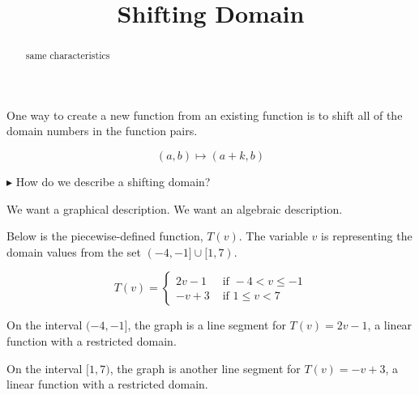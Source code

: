 \documentclass{ximera}
\title{Shifting Domain}
\begin{document}
\begin{abstract}
same characteristics
\end{abstract}
\maketitle








One way to create a new function from an existing function is to shift all of the domain numbers in the function pairs. 

\[
(a, b) \mapsto (a + k, b)
\]



\textbf{\textcolor{blue!55!black}{$\blacktriangleright$}} How do we describe a shifting domain? 

We want a graphical description. We want an algebraic description. 




Below is the piecewise-defined function, $T(v)$.  The variable $v$ is representing the domain values from the set $(-4,-1] \cup [1,7)$.




\[
T(v) = 
\begin{cases}
  2v-1 & \text{ if }  -4 < v \leq -1 \\
  -v+3 & \text{ if } 1 \leq v < 7
\end{cases}
\]


On the interval $(-4, -1]$, the graph is a line segment for $T(v) = 2v-1$, a linear function with a restricted domain. 



On the interval $[1, 7)$, the graph is another line segment for $T(v) = -v+3$, a linear function with a restricted domain. 
\end{document}
